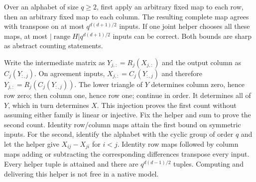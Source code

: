 \begin{proposition}\label{prop:row-column-agreement}
Over an alphabet of size $q\ge2$, first apply an arbitrary fixed map to
each row, then an arbitrary fixed map to each column. The resulting
complete map agrees with transpose on at most $q^{d(d+1)/2}$ inputs.
If one joint helper chooses all these maps, at most
$|\operatorname{range}H|q^{d(d+1)/2}$ inputs can be correct.
Both bounds are sharp as abstract counting statements.
\end{proposition}
\begin{outline}
Write the intermediate matrix as $Y_{j,:}=R_j(X_{j,:})$ and the output
column as $C_j(Y_{:,j})$. On agreement inputs,
$X_{j,:}=C_j(Y_{:,j})$ and therefore
$Y_{j,:}=R_j(C_j(Y_{:,j}))$. The lower triangle of $Y$ determines column
zero, hence row zero; then column one, hence row one; continue in order.
It determines all of $Y$, which in turn determines $X$. This injection
proves the first count without assuming either family is linear or
injective. Fix the helper and sum to prove the second count. Identity
row/column maps attain the first bound on symmetric inputs. For the
second, identify the alphabet with the cyclic group of order $q$ and
let the helper give $X_{ij}-X_{ji}$ for $i<j$. Identity row maps followed
by column maps adding or subtracting the corresponding differences
transpose every input. Every helper tuple is attained and there are
$q^{d(d-1)/2}$ tuples. Computing and delivering this helper is not free
in a native model.
\end{outline}
